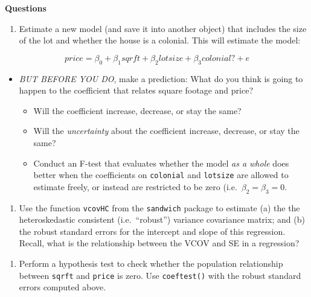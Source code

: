 \documentclass[
  letterpaper,
  DIV=11,
  numbers=noendperiod]{scrreprt}
\providecommand{\tightlist}{%
  \setlength{\itemsep}{0pt}\setlength{\parskip}{0pt}}\usepackage{longtable,booktabs,array}
\begin{document}
\textbf{Questions}

\begin{enumerate}
\def\labelenumi{\arabic{enumi}.}
\tightlist
\item
  Estimate a new model (and save it into another object) that includes
  the size of the lot and whether the house is a colonial. This will
  estimate the model:
\end{enumerate}

\[
  price = \beta_{0} + \beta_{1} sqrft + \beta_{2} lotsize + \beta_{3} colonial? + e
\]

\begin{itemize}
\tightlist
\item
  \emph{BUT BEFORE YOU DO}, make a prediction: What do you think is
  going to happen to the coefficient that relates square footage and
  price?

  \begin{itemize}
  \tightlist
  \item
    Will the coefficient increase, decrease, or stay the same?
  \item
    Will the \emph{uncertainty} about the coefficient increase,
    decrease, or stay the same?
  \item
    Conduct an F-test that evaluates whether the model \emph{as a whole}
    does better when the coefficients on \texttt{colonial} and
    \texttt{lotsize} are allowed to estimate freely, or instead are
    restricted to be zero (i.e.~\(\beta_{2} = \beta_{3} = 0\).
  \end{itemize}
\end{itemize}

\begin{enumerate}
\def\labelenumi{\arabic{enumi}.}
\setcounter{enumi}{1}
\tightlist
\item
  Use the function \texttt{vcovHC} from the \texttt{sandwich} package to
  estimate (a) the the heteroskedastic consistent (i.e.~``robust'')
  variance covariance matrix; and (b) the robust standard errors for the
  intercept and slope of this regression. Recall, what is the
  relationship between the VCOV and SE in a regression?
\end{enumerate}

\begin{enumerate}
\def\labelenumi{\arabic{enumi}.}
\setcounter{enumi}{2}
\tightlist
\item
  Perform a hypothesis test to check whether the population relationship
  between \texttt{sqrft} and \texttt{price} is zero. Use
  \texttt{coeftest()} with the robust standard errors computed above.
\end{enumerate}
\end{document}
